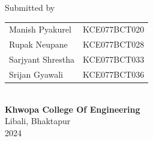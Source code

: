 \begin{center}
		\vspace{0.2in}
		\large{Submitted by}\\
		\vspace{0.1in}
		\begin{tabular}{p{3.5in}p{2in}}
			\hspace{0.3cm}Manish Pyakurel& \hspace{1cm}KCE077BCT020\\
			\hspace{0.3cm}Rupak Neupane& \hspace{1cm}KCE077BCT028\\
			\hspace{0.3cm}Sarjyant Shrestha& \hspace{1cm}KCE077BCT033\\
			\hspace{0.3cm}Srijan Gyawali& \hspace{1cm}KCE077BCT036\\
		\end{tabular}
		\\
		\vspace{1cm}
			\vspace{0.8cm}
		\large{\textbf{Khwopa College Of Engineering}\\}
			\normalsize{Libali, Bhaktapur\\
			2024
		}
    \end{center}
